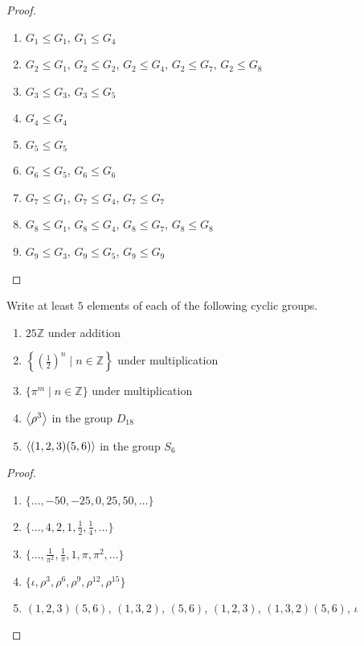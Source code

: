 \begin{proof}
    \begin{enumerate}
        \item $G_{1} \leq G_{1}$, $G_{1} \leq G_{4}$
        \item $G_{2} \leq G_{1}$, $G_{2} \leq G_{2}$, $G_{2} \leq G_{4}$, $G_{2} \leq G_{7}$, $G_{2} \leq G_{8}$
        \item $G_{3} \leq G_{3}$, $G_{3} \leq G_{5}$
        \item $G_{4} \leq G_{4}$
        \item $G_{5} \leq G_{5}$
        \item $G_{6} \leq G_{5}$, $G_{6} \leq G_{6}$
        \item $G_{7} \leq G_{1}$, $G_{7} \leq G_{4}$, $G_{7} \leq G_{7}$
        \item $G_{8} \leq G_{1}$, $G_{8} \leq G_{4}$, $G_{8} \leq G_{7}$, $G_{8} \leq G_{8}$
        \item $G_{9} \leq G_{3}$, $G_{9} \leq G_{5}$, $G_{9} \leq G_{9}$
    \end{enumerate}
\end{proof}

\newpage
\begin{exercise}
    Write at least $5$ elements of each of the following cyclic groups.
    \begin{enumerate}[label={\textbf{\alph*.}}]
        \item $25\mathbb{Z}$ under addition
        \item $\left\{ {\left(\frac{1}{2}\right)}^{n} \mid n\in\mathbb{Z} \right\}$ under multiplication
        \item $\{ \pi^{m} \mid n\in\mathbb{Z} \}$ under multiplication
        \item $\left\langle{\rho^{3}}\right\rangle$ in the group $D_{18}$
        \item $\left\langle{(1, 2, 3)(5, 6)}\right\rangle$ in the group $S_{6}$
    \end{enumerate}
\end{exercise}

\begin{proof}
    \begin{enumerate}[label={\textbf{\alph*}}]
        \item $\{ \ldots, -50, -25, 0, 25, 50, \ldots \}$
        \item $\{ \ldots, 4, 2, 1, \frac{1}{2}, \frac{1}{4}, \ldots \}$
        \item $\{ \ldots, \frac{1}{\pi^{2}}, \frac{1}{\pi}, 1, \pi, \pi^{2}, \ldots \}$
        \item $\{ \iota, \rho^{3}, \rho^{6}, \rho^{9}, \rho^{12}, \rho^{15} \}$
        \item $(1, 2, 3)(5, 6)$, $(1, 3, 2)$, $(5, 6)$, $(1, 2, 3)$, $(1, 3, 2)(5, 6)$, $\iota$
    \end{enumerate}
\end{proof}

